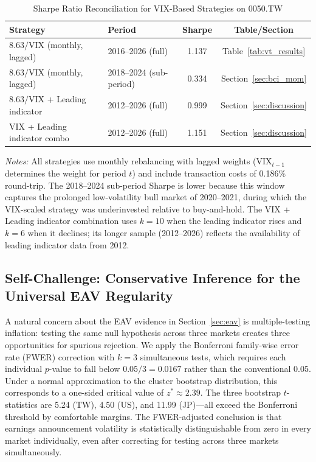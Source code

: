 \begin{table}[H]
\centering
\caption{Sharpe Ratio Reconciliation for VIX-Based Strategies on 0050.TW}
\label{tab:sharpe_reconciliation}
\begin{tabular}{llcc}
\toprule
Strategy & Period & Sharpe & Table/Section \\
\midrule
$8.63/\text{VIX}$ (monthly, lagged) & 2016--2026 (full) & 1.137 & Table~\ref{tab:vt_results} \\
$8.63/\text{VIX}$ (monthly, lagged) & 2018--2024 (sub-period) & 0.334 & Section~\ref{sec:bci_mom} \\
$8.63/\text{VIX}$ + Leading indicator & 2012--2026 (full) & 0.999 & Section~\ref{sec:discussion} \\
VIX + Leading indicator combo & 2012--2026 (full) & 1.151 & Section~\ref{sec:discussion} \\
\bottomrule
\end{tabular}
\begin{flushleft}
\small \textit{Notes:} All strategies use monthly rebalancing with lagged weights (VIX$_{t-1}$ determines the weight for period $t$) and include transaction costs of 0.186\% round-trip. The 2018--2024 sub-period Sharpe is lower because this window captures the prolonged low-volatility bull market of 2020--2021, during which the VIX-scaled strategy was underinvested relative to buy-and-hold. The VIX + Leading indicator combination uses $k = 10$ when the leading indicator rises and $k = 6$ when it declines; its longer sample (2012--2026) reflects the availability of leading indicator data from 2012.
\end{flushleft}
\end{table}

\subsection{Self-Challenge: Conservative Inference for the Universal EAV Regularity}
\label{sec:eav_self_challenge}

A natural concern about the EAV evidence in Section~\ref{sec:eav} is multiple-testing inflation: testing the same null hypothesis across three markets creates three opportunities for spurious rejection. We apply the Bonferroni family-wise error rate (FWER) correction with $k=3$ simultaneous tests, which requires each individual $p$-value to fall below $0.05/3 = 0.0167$ rather than the conventional 0.05. Under a normal approximation to the cluster bootstrap distribution, this corresponds to a one-sided critical value of $z^{*} \approx 2.39$. The three bootstrap $t$-statistics are 5.24 (TW), 4.50 (US), and 11.99 (JP)---all exceed the Bonferroni threshold by comfortable margins. The FWER-adjusted conclusion is that earnings announcement volatility is statistically distinguishable from zero in every market individually, even after correcting for testing across three markets simultaneously.

